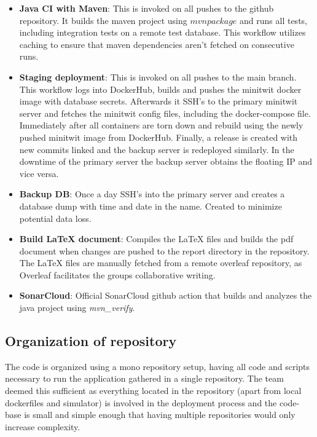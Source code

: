 \begin{itemize}
    \item \textbf{Java CI with Maven}: This is invoked on all pushes to the github repository. It builds the maven project using $mvn package$ and runs all tests, including integration tests on a remote test database. This workflow utilizes caching to ensure that maven dependencies aren't fetched on consecutive runs. 
    \item \textbf{Staging deployment}: This is invoked on all pushes to the main branch. This workflow logs into DockerHub, builds and pushes the minitwit docker image with database secrets. Afterwards it SSH's to the primary minitwit server and fetches the minitwit config files, including the docker-compose file. Immediately after all containers are torn down and rebuild using the newly pushed minitwit image from DockerHub. Finally, a release is created with new commits linked and the backup server is redeployed similarly. In the downtime of the primary server the backup server obtains the floating IP and vice versa. 
    \item \textbf{Backup DB}: Once a day SSH's into the primary server and creates a database dump with time and date in the name. Created to minimize potential data loss. 
    \item \textbf{Build LaTeX document}: Compiles the LaTeX files and builds the pdf document when changes are pushed to the report directory in the repository. The LaTeX files are manually fetched from a remote overleaf repository, as Overleaf facilitates the groups collaborative writing. 
    \item \textbf{SonarCloud}: Official SonarCloud github action that builds and analyzes the java project using \textit{mvn\_verify}. 
\end{itemize}


\subsection{Organization of repository}
The code is organized using a mono repository setup, having all code and scripts necessary to run the application gathered in a single repository. The team deemed this sufficient as everything located in the repository (apart from local dockerfiles and simulator) is involved in the deployment process and the code-base is small and simple enough that having multiple repositories would only increase complexity. 


